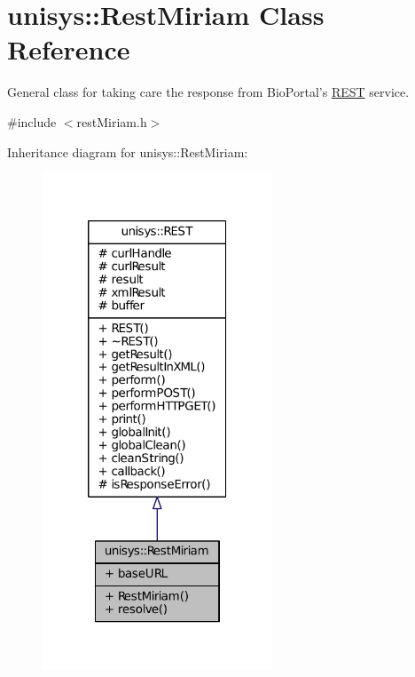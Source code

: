 \hypertarget{classunisys_1_1RestMiriam}{\section{unisys\-:\-:Rest\-Miriam Class Reference}
\label{classunisys_1_1RestMiriam}
}


General class for taking care the response from Bio\-Portal's \hyperlink{classunisys_1_1REST}{R\-E\-S\-T} service.  




{\ttfamily \#include $<$rest\-Miriam.\-h$>$}



Inheritance diagram for unisys\-:\-:Rest\-Miriam\-:
\nopagebreak
\begin{figure}[H]
\begin{center}
\leavevmode
\includegraphics[width=194pt]{classunisys_1_1RestMiriam__inherit__graph}
\end{center}
\end{figure}


